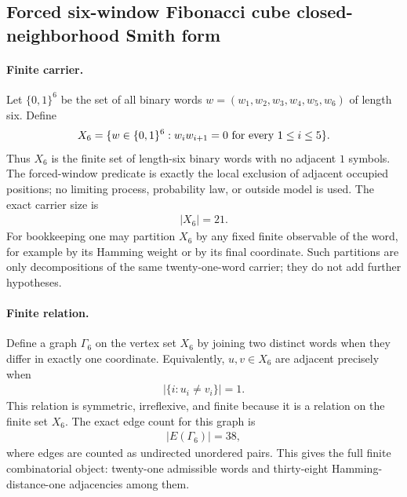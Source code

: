 \subsection{Forced six-window Fibonacci cube closed-neighborhood Smith form}
\label{sec:window6-fibonacci-cube-closed-neighborhood-smith}

\paragraph{Finite carrier.}
Let $\{0,1\}^6$ be the set of all binary words $w=(w_1,w_2,w_3,w_4,w_5,w_6)$ of length six. Define
$$
\begin{aligned}
X_6=\{w\in \{0,1\}^6 : w_iw_{i+1}=0\hbox{ for every }1\leq i\leq 5\}.
\end{aligned}
$$
Thus $X_6$ is the finite set of length-six binary words with no adjacent $1$ symbols. The forced-window predicate is exactly the local exclusion of adjacent occupied positions; no limiting process, probability law, or outside model is used. The exact carrier size is
$$
\begin{aligned}
|X_6|=21.
\end{aligned}
$$
For bookkeeping one may partition $X_6$ by any fixed finite observable of the word, for example by its Hamming weight or by its final coordinate. Such partitions are only decompositions of the same twenty-one-word carrier; they do not add further hypotheses.

\paragraph{Finite relation.}
Define a graph $\Gamma_6$ on the vertex set $X_6$ by joining two distinct words when they differ in exactly one coordinate. Equivalently, $u,v\in X_6$ are adjacent precisely when
$$
\begin{aligned}
|\{i: u_i\neq v_i\}|=1.
\end{aligned}
$$
This relation is symmetric, irreflexive, and finite because it is a relation on the finite set $X_6$. The exact edge count for this graph is
$$
\begin{aligned}
|E(\Gamma_6)|=38,
\end{aligned}
$$
where edges are counted as undirected unordered pairs. This gives the full finite combinatorial object: twenty-one admissible words and thirty-eight Hamming-distance-one adjacencies among them.

